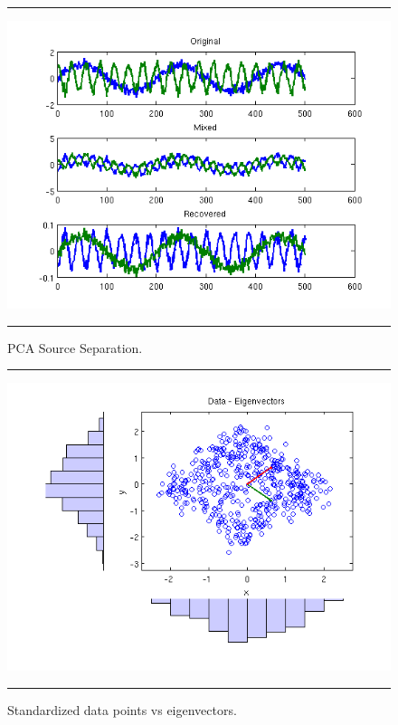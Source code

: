 \documentclass[11pt, oneside, a4paper]{report}
\begin{document}
\begin{figure}
  \centering
  \hrule
  \includegraphics[width = .9\textwidth]{Figures/pca_signal_time_series}
  \hrule
  \caption{PCA Source Separation.}
  \label{pca_time_series}
\end{figure}

\begin{figure}
  \centering
  \hrule
  \includegraphics[width = .9\textwidth]{Figures/pca_data_eigs}
  \hrule
  \caption{Standardized data points vs eigenvectors.}
\end{figure}
\end{document}
